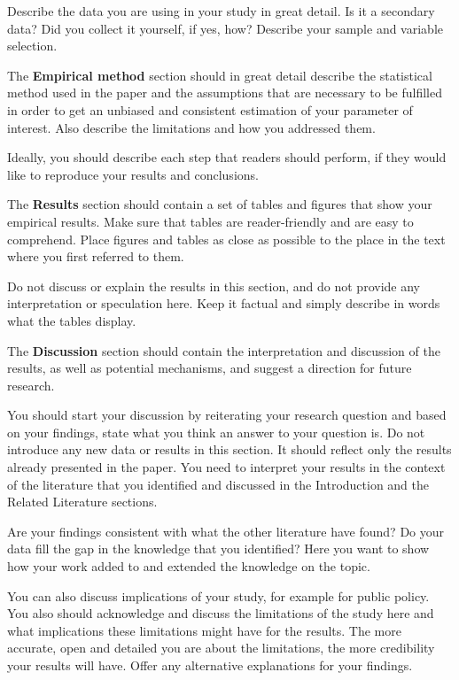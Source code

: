 \documentclass[
]{book}
\begin{document}
Describe the data you are using in your study in great detail. Is it a
secondary data? Did you collect it yourself, if yes, how? Describe your
sample and variable selection.

The \textbf{Empirical method} section should in great detail describe
the statistical method used in the paper and the assumptions that are
necessary to be fulfilled in order to get an unbiased and consistent
estimation of your parameter of interest. Also describe the limitations
and how you addressed them.

Ideally, you should describe each step that readers should perform, if
they would like to reproduce your results and conclusions.

The \textbf{Results} section should contain a set of tables and figures
that show your empirical results. Make sure that tables are
reader-friendly and are easy to comprehend. Place figures and tables as
close as possible to the place in the text where you first referred to
them.

Do not discuss or explain the results in this section, and do not
provide any interpretation or speculation here. Keep it factual and
simply describe in words what the tables display.

The \textbf{Discussion} section should contain the interpretation and
discussion of the results, as well as potential mechanisms, and suggest
a direction for future research.

You should start your discussion by reiterating your research question
and based on your findings, state what you think an answer to your
question is. Do not introduce any new data or results in this section.
It should reflect only the results already presented in the paper. You
need to interpret your results in the context of the literature that you
identified and discussed in the Introduction and the Related Literature
sections.

Are your findings consistent with what the other literature have found?
Do your data fill the gap in the knowledge that you identified? Here you
want to show how your work added to and extended the knowledge on the
topic.

You can also discuss implications of your study, for example for public
policy. You also should acknowledge and discuss the limitations of the
study here and what implications these limitations might have for the
results. The more accurate, open and detailed you are about the
limitations, the more credibility your results will have. Offer any
alternative explanations for your findings.
\end{document}
